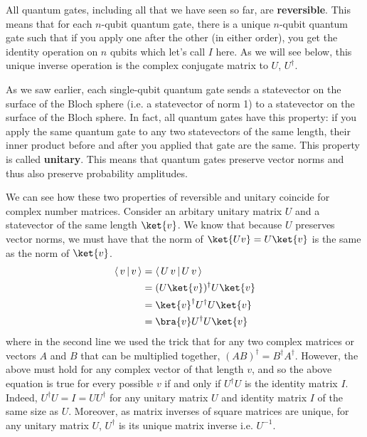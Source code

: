 \documentclass{article}
\theoremstyle{definition}
\begin{document}
\begin{example}
\begin{note}
		All quantum gates, including all that we have seen so far, are \textbf{reversible}.  This means that for each $n$-qubit quantum gate, there is a unique $n$-qubit quantum gate such that if you apply one after the other (in either order), you get the identity operation on $n$ qubits which let's call $I$ here.  As we will see below, this unique inverse operation is the complex conjugate matrix to $U$, $U^\dagger$.

		As we saw earlier, each single-qubit quantum gate sends a statevector on the surface of the Bloch sphere (i.e. a statevector of norm 1) to a statevector on the surface of the Bloch sphere.
		In fact, all quantum gates have this property: if you apply the same quantum gate to any two statevectors of the same length, their inner product before and after you applied that gate are the same.  This property is called \textbf{unitary}.
		This means that quantum gates preserve vector norms and thus also preserve probability amplitudes.

		We can see how these two properties of reversible and unitary coincide for complex number matrices.
		Consider an arbitary unitary matrix $U$ and a statevector of the same length $\ket{v}$.
		We know that because $U$ preserves vector norms, we must have that the norm of $\ket{Uv}=U\ket{v}$ is the same as the norm of $\ket{v}$.
		\begin{align}
			\langle \,v\,|\,v\,\rangle &= \langle \,U\,v\,|\,U\,v\,\rangle\\
			&= (U\ket{v})^\dagger U\ket{v}\\
			&= \ket{v}^\dagger U^\dagger U \ket{v}\\
			&= \bra{v} U^\dagger U \ket{v}
		\end{align}
		where in the second line we used the trick that for any two complex matrices or vectors $A$ and $B$ that can be multiplied together, $(AB)^\dagger = B^\dagger A^\dagger$.
		However, the above must hold for any complex vector of that length $v$, and so the above equation is true for every possible $v$ if and only if $U^\dagger U$ is the identity matrix $I$.  Indeed, $U^\dagger U = I = U U^\dagger$ for any unitary matrix $U$ and identity matrix $I$ of the same size as $U$.  Moreover, as matrix inverses of square matrices are unique, for any unitary matrix $U$, $U^\dagger$ is its unique matrix inverse i.e. $U^{-1}$.
	\end{note}
\end{example}
\end{document}
